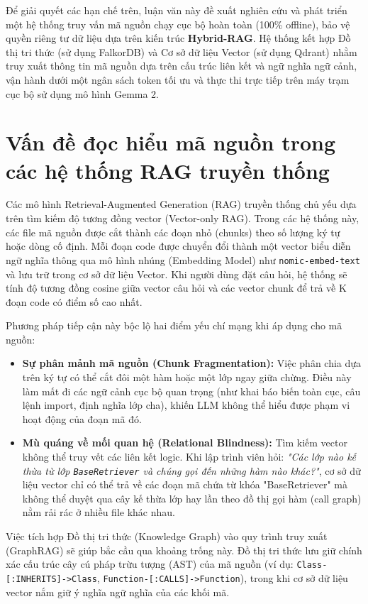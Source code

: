 \documentclass[12pt,a4paper,oneside]{report}
\begin{document}
Để giải quyết các hạn chế trên, luận văn này đề xuất nghiên cứu và phát triển một hệ thống truy vấn mã nguồn chạy cục bộ hoàn toàn (100\% offline), bảo vệ quyền riêng tư dữ liệu dựa trên kiến trúc \textbf{Hybrid-RAG}. Hệ thống kết hợp Đồ thị tri thức (sử dụng FalkorDB) và Cơ sở dữ liệu Vector (sử dụng Qdrant) nhằm truy xuất thông tin mã nguồn dựa trên cấu trúc liên kết và ngữ nghĩa ngữ cảnh, vận hành dưới một ngân sách token tối ưu và thực thi trực tiếp trên máy trạm cục bộ sử dụng mô hình Gemma 2.

\section{Vấn đề đọc hiểu mã nguồn trong các hệ thống RAG truyền thống}
Các mô hình Retrieval-Augmented Generation (RAG) truyền thống chủ yếu dựa trên tìm kiếm độ tương đồng vector (Vector-only RAG). Trong các hệ thống này, các file mã nguồn được cắt thành các đoạn nhỏ (chunks) theo số lượng ký tự hoặc dòng cố định. Mỗi đoạn code được chuyển đổi thành một vector biểu diễn ngữ nghĩa thông qua mô hình nhúng (Embedding Model) như \texttt{nomic-embed-text} và lưu trữ trong cơ sở dữ liệu Vector. Khi người dùng đặt câu hỏi, hệ thống sẽ tính độ tương đồng cosine giữa vector câu hỏi và các vector chunk để trả về K đoạn code có điểm số cao nhất.

Phương pháp tiếp cận này bộc lộ hai điểm yếu chí mạng khi áp dụng cho mã nguồn:
\begin{itemize}
    \item \textbf{Sự phân mảnh mã nguồn (Chunk Fragmentation):} Việc phân chia dựa trên ký tự có thể cắt đôi một hàm hoặc một lớp ngay giữa chừng. Điều này làm mất đi các ngữ cảnh cục bộ quan trọng (như khai báo biến toàn cục, câu lệnh import, định nghĩa lớp cha), khiến LLM không thể hiểu được phạm vi hoạt động của đoạn mã đó.
    \item \textbf{Mù quáng về mối quan hệ (Relational Blindness):} Tìm kiếm vector không thể truy vết các liên kết logic. Khi lập trình viên hỏi: \textit{"Các lớp nào kế thừa từ lớp \texttt{BaseRetriever} và chúng gọi đến những hàm nào khác?"}, cơ sở dữ liệu vector chỉ có thể trả về các đoạn mã chứa từ khóa "BaseRetriever" mà không thể duyệt qua cây kế thừa lớp hay lần theo đồ thị gọi hàm (call graph) nằm rải rác ở nhiều file khác nhau.
\end{itemize}

Việc tích hợp Đồ thị tri thức (Knowledge Graph) vào quy trình truy xuất (GraphRAG) sẽ giúp bắc cầu qua khoảng trống này. Đồ thị tri thức lưu giữ chính xác cấu trúc cây cú pháp trừu tượng (AST) của mã nguồn (ví dụ: \texttt{Class-[:INHERITS]->Class}, \texttt{Function-[:CALLS]->Function}), trong khi cơ sở dữ liệu vector nắm giữ ý nghĩa ngữ nghĩa của các khối mã.
\end{document}
